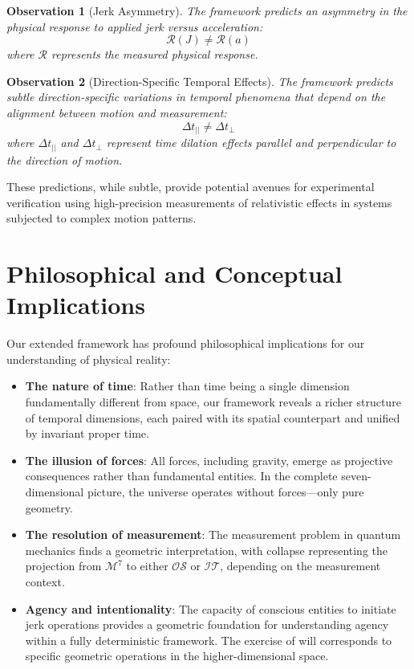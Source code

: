 \documentclass{article}
\newtheorem{observation}{Observation}
\begin{document}
\begin{observation}[Jerk Asymmetry]
The framework predicts an asymmetry in the physical response to applied jerk versus acceleration:
\begin{equation}
\mathcal{R}(J) \neq \mathcal{R}(a)
\end{equation}
where $\mathcal{R}$ represents the measured physical response.
\end{observation}

\begin{observation}[Direction-Specific Temporal Effects]
The framework predicts subtle direction-specific variations in temporal phenomena that depend on the alignment between motion and measurement:
\begin{equation}
\Delta t_{||} \neq \Delta t_{\perp}
\end{equation}
where $\Delta t_{||}$ and $\Delta t_{\perp}$ represent time dilation effects parallel and perpendicular to the direction of motion.
\end{observation}

These predictions, while subtle, provide potential avenues for experimental verification using high-precision measurements of relativistic effects in systems subjected to complex motion patterns.

\section{Philosophical and Conceptual Implications}

Our extended framework has profound philosophical implications for our understanding of physical reality:

\begin{itemize}
\item \textbf{The nature of time}: Rather than time being a single dimension fundamentally different from space, our framework reveals a richer structure of temporal dimensions, each paired with its spatial counterpart and unified by invariant proper time.

\item \textbf{The illusion of forces}: All forces, including gravity, emerge as projective consequences rather than fundamental entities. In the complete seven-dimensional picture, the universe operates without forces—only pure geometry.

\item \textbf{The resolution of measurement}: The measurement problem in quantum mechanics finds a geometric interpretation, with collapse representing the projection from $\mathcal{M}^7$ to either $\mathcal{OS}$ or $\mathcal{IT}$, depending on the measurement context.

\item \textbf{Agency and intentionality}: The capacity of conscious entities to initiate jerk operations provides a geometric foundation for understanding agency within a fully deterministic framework. The exercise of will corresponds to specific geometric operations in the higher-dimensional space.
\end{itemize}
\end{document}
